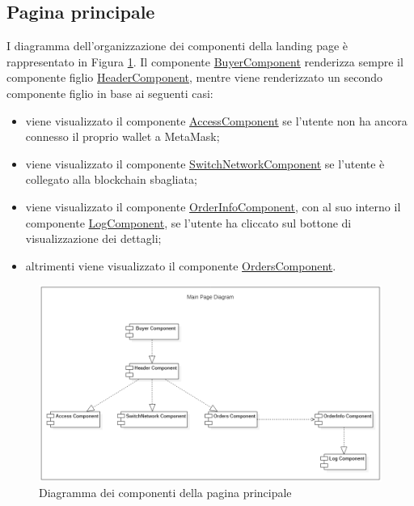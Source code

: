 \newpage

\subsection*{Pagina principale}
I diagramma dell'organizzazione dei componenti della landing page è rappresentato in Figura \ref{fig:components-main-page}. Il componente \hyperref[sec:buyer-component]{BuyerComponent} renderizza sempre il componente figlio \hyperref[sec:header-component]{HeaderComponent}, mentre viene renderizzato un secondo componente figlio in base ai seguenti casi:
\begin{itemize}
    \item viene visualizzato il componente \hyperref[sec:access-component]{AccessComponent} se l'utente non ha ancora connesso il proprio wallet a MetaMask;
    \item viene visualizzato il componente \hyperref[sec:switch-component]{SwitchNetworkComponent} se l'utente è collegato alla blockchain sbagliata;
    \item viene visualizzato il componente \hyperref[sec:order-info-component]{OrderInfoComponent}, con al suo interno il componente \hyperref[sec:log-component]{LogComponent}, se l'utente ha cliccato sul bottone di visualizzazione dei dettagli;
    \item altrimenti viene visualizzato il componente \hyperref[sec:orders-component]{OrdersComponent}.
\end{itemize}

\begin{figure}[!h] 
    \centering 
    \includegraphics[width=0.8\columnwidth]{immagini/MainPageComponentsDiagram.png}
    \caption{Diagramma dei componenti della pagina principale}
    \label{fig:components-main-page}
\end{figure}

\newpage

